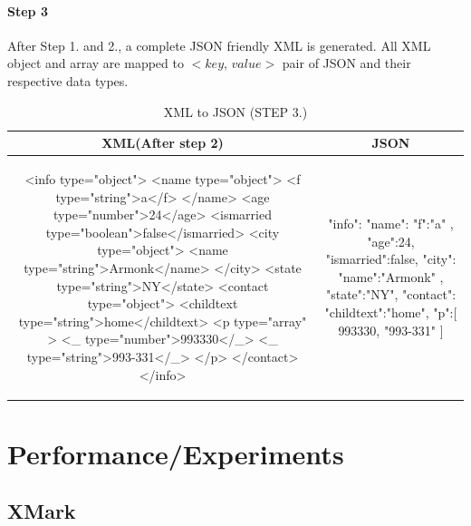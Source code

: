 \documentclass[a4paper,12pt]{article}
\begin{document}
\paragraph{Step 3}
	After Step 1. and 2., a complete JSON friendly XML is generated. All XML object and array are mapped to $<$$key$, $value$$>$ pair of JSON and their respective data types.
	\begin{longtable}{c|c}
	\caption{XML to JSON (STEP 3.)}
	\label{tbl:xmljson-convert-3}\\
	\textbf{XML(After step 2)} & \textbf{JSON}\\
	\hline
\begin{minipage}{.55\textwidth}
\begin{fakeXML}
<info type="object">
  <name type="object">
    <f type="string">a</f>
  </name>
  <age type="number">24</age>
  <ismarried type="boolean">false</ismarried>
  <city type="object">
    <name type="string">Armonk</name>
  </city>
  <state type="string">NY</state>
  <contact type="object">
	<childtext type="string">home</childtext>
    <p  type="array" >
	   <_ type="number">993330</_>
	   <_ type="string">993-331</_>
    </p>
  </contact>
</info>
\end{fakeXML}	
\end{minipage} &
\begin{minipage}{.5\textwidth}
\begin{fakeJSON}
{
    "info":{
      "name":{
        "f":"a"
      },
      "age":24,
      "ismarried":false,
      "city":{
        "name":"Armonk"
      },
      "state":"NY",
      "contact":{
	   "childtext":"home",
        "p":[
          993330,
          "993-331"
        ]
      }
    }
}
\end{fakeJSON}
\end{minipage}\\
\end{longtable}

\newpage
	
	\newpage
	\section{Performance/Experiments}
	\label{sec:four}
		\subsection{XMark}
		\label{xmark}
			
		\newpage
\end{document}
